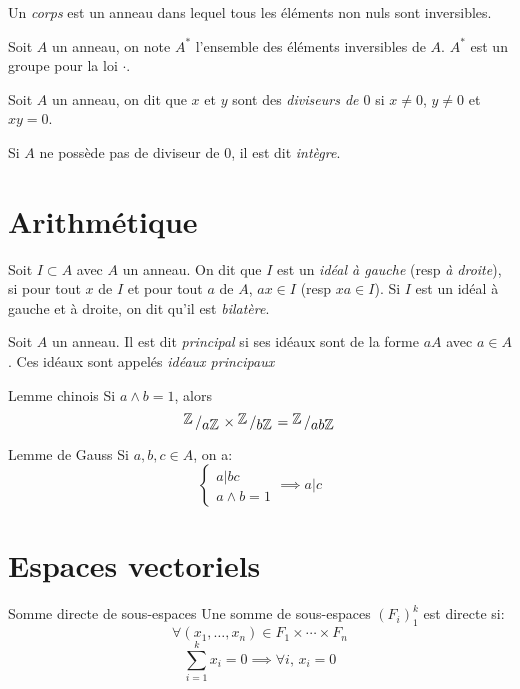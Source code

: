 \documentclass[french, a4paper, 11pt, twocolumn]{article}
\newcommand{\bigslant}[2]{{\raisebox{.2em}{\(#1\)}\left/\raisebox{-.2em}{\(#2\)}\right.}}
\newcommand{\Z}{\mathbb{Z}}   %
\begin{document}
\begin{definition}
  Un \emph{corps} est un anneau dans lequel tous les éléments non nuls sont inversibles.

  Soit \(A\) un anneau, on note \(A^{*}\) l'ensemble des éléments inversibles de \(A\). \(A^{*}\) est un groupe pour la loi \(\cdot\).
\end{definition}

\begin{definition}
  Soit \(A\) un anneau, on dit que \(x\) et \(y\) sont des \emph{diviseurs de \(0\)} si \(x\neq 0\), \(y\neq 0\) et \(xy=0\).

  Si \(A\) ne possède pas de diviseur de \(0\), il est dit \emph{intègre}.
\end{definition}

\section{Arithmétique}
\begin{definition}
  Soit \(I\subset A\) avec \(A\) un anneau. On dit que \(I\) est un \emph{idéal à gauche} (resp \emph{à droite}), si pour tout \(x\) de \(I\) et pour tout \(a\) de \(A\), \(ax\in I\) (resp \(xa \in I\)). Si \(I\) est un idéal à gauche et à droite, on dit qu'il est \emph{bilatère}.
\end{definition}

\begin{definition}
  Soit \(A\) un anneau. Il est dit \emph{principal} si ses idéaux sont de la forme \(aA\) avec \(a\in A\). Ces idéaux sont appelés \emph{idéaux principaux}
\end{definition}

\begin{theoreme}{Lemme chinois}
  Si \(a \wedge b = 1\), alors
  \[\bigslant{\Z}{a\Z}\times\bigslant{\Z}{b\Z} = \bigslant{\Z}{ab\Z}\]
\end{theoreme}

\begin{theoreme}{Lemme de Gauss}
  Si \(a,b,c\in A\), on a:
  \[\begin{cases}
      a|bc\\
      a\wedge b = 1
    \end{cases}\implies a|c\]
\end{theoreme}

\section{Espaces vectoriels}
\begin{theoreme}{Somme directe de sous-espaces}
  Une somme de sous-espaces \((F_{i})_{1}^{k}\) est directe si:
  \[\forall (x_{1},\ldots,x_{n}) \in F_{1}\times \cdots\times F_{n}\]
  \[\sum_{i=1}^k x_{i} = 0 \implies \forall i,\, x_{i}=0\]
\end{theoreme}
\end{document}
